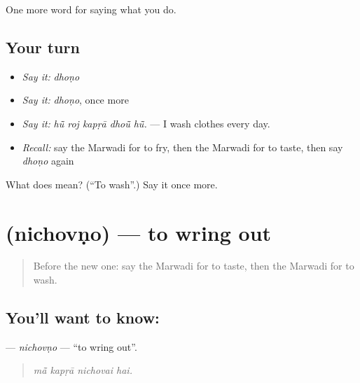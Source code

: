 \begin{grammarlens}[title={What you've built}]
One more word for saying what you do.
\end{grammarlens}

\subsection*{Your turn}
\begin{itemize}
\raggedright
  \item \emph{Say it:} \emph{dhoṇo}
  \item \emph{Say it:} \emph{dhoṇo}, once more
  \item \emph{Say it:} \emph{hū̃ roj kapṛā dhoū̃ hū̃.} — I wash clothes every day.
  \item \emph{Recall:} say the Marwadi for to fry, then the Marwadi for to taste, then say \emph{dhoṇo} again
\end{itemize}

\begin{tcolorbox}[breakable,colback=teal!4,colframe=teal!35!black,title={Before you move on}]
What does  mean? (\textquotedblleft{}To wash\textquotedblright{}.) Say it once more.
\end{tcolorbox}
\section[\texorpdfstring{\mw{निचोवणो} (nichovṇo)}{निचोवणो (nichovṇo)}]{ (nichovṇo) — to wring out}

\label{lesson:MW-C170-nichovno}



\begin{quote}
Before the new one: say the Marwadi for to taste, then the Marwadi for to wash.
\end{quote}

\subsection*{You'll want to know: }
\textbf{} — \emph{nichovṇo} — \textquotedblleft{}to wring out\textquotedblright{}.

\begin{quote}
   
\end{quote}

\begin{quote}
\emph{mā̃ kapṛā nichovai hai.}
\end{quote}

